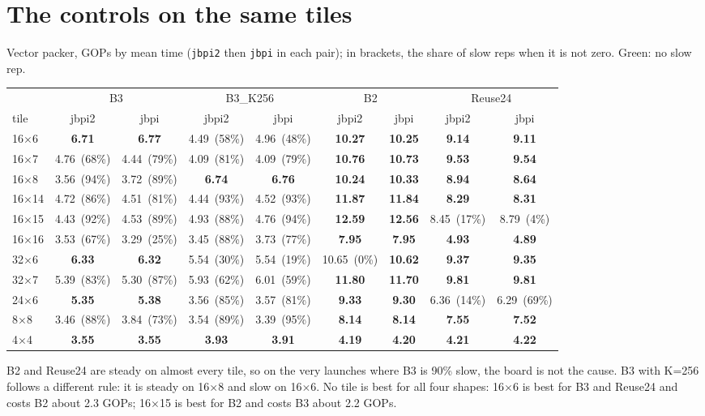 \documentclass[10pt,a4paper]{article}
\newcommand{\good}[1]{\textcolor{green!45!black}{\textbf{#1}}}
\begin{document}
\section{The controls on the same tiles}
Vector packer, GOPs by mean time (\texttt{jbpi2} then \texttt{jbpi} in each pair); in brackets, the share of slow reps
when it is not zero. Green: no slow rep.

\begin{center}\footnotesize\setlength{\tabcolsep}{4pt}
\begin{tabular}{@{}lcccccccc@{}}
\toprule
 & \multicolumn{2}{c}{B3} & \multicolumn{2}{c}{B3\_K256} & \multicolumn{2}{c}{B2} & \multicolumn{2}{c}{Reuse24} \\
\cmidrule(lr){2-3}\cmidrule(lr){4-5}\cmidrule(lr){6-7}\cmidrule(lr){8-9}
tile & jbpi2 & jbpi & jbpi2 & jbpi & jbpi2 & jbpi & jbpi2 & jbpi \\
\midrule
16$\times$6 & \good{6.71} & \good{6.77} & 4.49~(58\%) & 4.96~(48\%) & \good{10.27} & \good{10.25} & \good{9.14} & \good{9.11} \\
16$\times$7 & 4.76~(68\%) & 4.44~(79\%) & 4.09~(81\%) & 4.09~(79\%) & \good{10.76} & \good{10.73} & \good{9.53} & \good{9.54} \\
16$\times$8 & 3.56~(94\%) & 3.72~(89\%) & \good{6.74} & \good{6.76} & \good{10.24} & \good{10.33} & \good{8.94} & \good{8.64} \\
16$\times$14 & 4.72~(86\%) & 4.51~(81\%) & 4.44~(93\%) & 4.52~(93\%) & \good{11.87} & \good{11.84} & \good{8.29} & \good{8.31} \\
16$\times$15 & 4.43~(92\%) & 4.53~(89\%) & 4.93~(88\%) & 4.76~(94\%) & \good{12.59} & \good{12.56} & 8.45~(17\%) & 8.79~(4\%) \\
16$\times$16 & 3.53~(67\%) & 3.29~(25\%) & 3.45~(88\%) & 3.73~(77\%) & \good{7.95} & \good{7.95} & \good{4.93} & \good{4.89} \\
32$\times$6 & \good{6.33} & \good{6.32} & 5.54~(30\%) & 5.54~(19\%) & 10.65~(0\%) & \good{10.62} & \good{9.37} & \good{9.35} \\
32$\times$7 & 5.39~(83\%) & 5.30~(87\%) & 5.93~(62\%) & 6.01~(59\%) & \good{11.80} & \good{11.70} & \good{9.81} & \good{9.81} \\
24$\times$6 & \good{5.35} & \good{5.38} & 3.56~(85\%) & 3.57~(81\%) & \good{9.33} & \good{9.30} & 6.36~(14\%) & 6.29~(69\%) \\
8$\times$8 & 3.46~(88\%) & 3.84~(73\%) & 3.54~(89\%) & 3.39~(95\%) & \good{8.14} & \good{8.14} & \good{7.55} & \good{7.52} \\
4$\times$4 & \good{3.55} & \good{3.55} & \good{3.93} & \good{3.91} & \good{4.19} & \good{4.20} & \good{4.21} & \good{4.22} \\
\bottomrule
\end{tabular}
\end{center}
B2 and Reuse24 are steady on almost every tile, so on the very launches where B3 is 90\% slow, the board is not the
cause. B3 with K=256 follows a different rule: it is steady on 16$\times$8 and slow on 16$\times$6. No tile is best for all four
shapes: 16$\times$6 is best for B3 and Reuse24 and costs B2 about 2.3 GOPs; 16$\times$15 is best for B2 and costs B3
about 2.2 GOPs.
\end{document}
